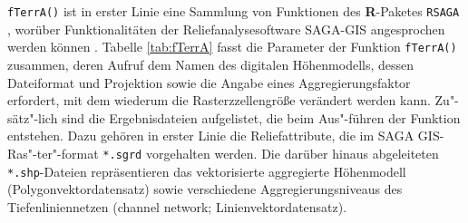 \texttt{fTerrA()} ist in erster Linie eine Sammlung von Funktionen des \textbf{R}-Paketes \texttt{RSAGA} \citep{Brenning-etal2018}, worüber Funktionalitäten der Reliefanalysesoftware SAGA-GIS angesprochen werden können \citep{Conrad-etal2015gmd}. Tabelle \ref{tab:fTerrA} fasst die Parameter der Funktion \texttt{fTerrA()} zusammen, deren Aufruf dem Namen des digitalen Höhenmodells, dessen Dateiformat und Projektion sowie die Angabe eines Aggregierungsfaktor erfordert, mit dem wiederum die Rasterzzellengröße verändert werden kann. Zu"-sätz"-lich sind die Ergebnisdateien aufgelistet, die beim Aus"-führen der Funktion entstehen. Dazu gehören in erster Linie die Reliefattribute, die im SAGA GIS-Ras"-ter"-format \texttt{*.sgrd} vorgehalten werden. Die  darüber  hinaus abgeleiteten  \texttt{*.shp}-Dateien repräsentieren das vektorisierte aggregierte Höhenmodell (Polygonvektordatensatz) sowie verschiedene Aggregierungsniveaus des Tiefenliniennetzen (channel network; Linienvektordatensatz).




